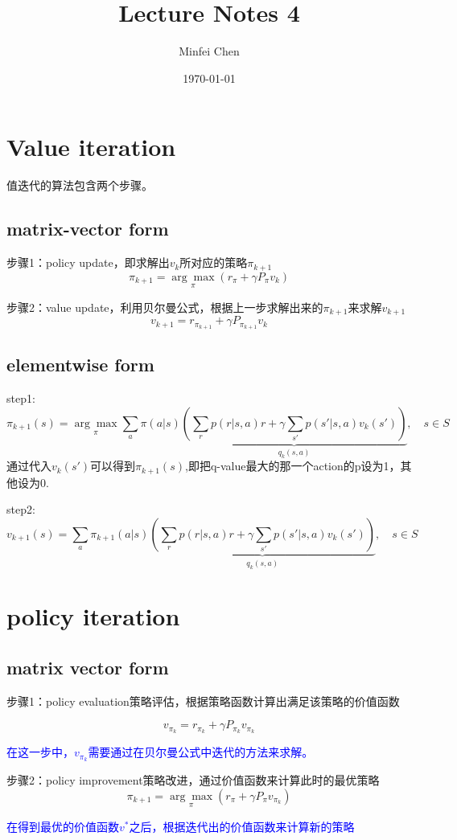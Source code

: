 \documentclass{article}
\begin{document}
\title{Lecture Notes 4}
\author{Minfei Chen}
\date{\today}
\maketitle
\section{Value iteration}
值迭代的算法包含两个步骤。
\subsection{matrix-vector form}
步骤1：policy update，即求解出${v_k}$所对应的策略${\pi_{k+1}}$
$$
\pi_{k+1} = \underset{\pi}{\arg\max} (r_{\pi} + \gamma P_{\pi} v_k)
$$

步骤2：value update，利用贝尔曼公式，根据上一步求解出来的${\pi_{k+1}}$来求解${v_{k+1}}$
$$
v_{k+1} = r_{\pi_{k+1}} + \gamma P_{\pi_{k+1}} v_k
$$
\subsection{elementwise form}
step1:
$$
\pi_{k+1}(s) = \underset{\pi}{\arg\max} \sum_{a} \pi(a|s) \underbrace{\left( \sum_{r} p(r|s, a)r + \gamma \sum_{s'} p(s'|s, a)v_k(s') \right)}_{q_k(s,a)}, \quad s \in S
$$
通过代入$v_k(s')$可以得到$\pi_{k+1}(s)$,即把q-value最大的那一个action的p设为1，其他设为0.

step2:
$$
v_{k+1}(s) = \sum_{a} \pi_{k+1}(a|s) \underbrace{\left( \sum_{r} p(r|s, a)r + \gamma \sum_{s'} p(s'|s, a)v_k(s') \right)}_{q_k(s,a)}, \quad s \in S
$$
\section{policy iteration}
\subsection{matrix vector form}
步骤1：policy evaluation策略评估，根据策略函数计算出满足该策略的价值函数

$$
v_{\pi_k} = r_{\pi_k} + \gamma P_{\pi_k} v_{\pi_k}
$$

\textcolor{blue}{\kaishu 在这一步中，$v_{\pi_k}$需要通过在贝尔曼公式中迭代的方法来求解。}

步骤2：policy improvement策略改进，通过价值函数来计算此时的最优策略
$$
\pi_{k+1} = \underset{\pi}{\arg\max} (r_{\pi} + \gamma P_{\pi} v_{\pi_k})
$$

\textcolor{blue}{\kaishu 在得到最优的价值函数$v^*$之后，根据迭代出的价值函数来计算新的策略}
\end{document}
